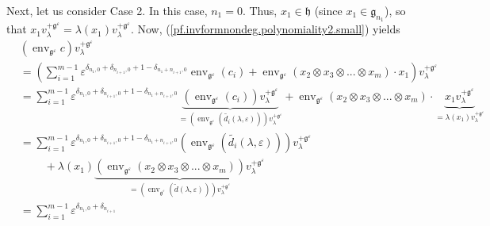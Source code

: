\documentclass[etingof-lie.tex]{subfiles}
\begin{document}
Next, let us consider Case 2. In this case, $n_{1}=0$. Thus, $x_{1}%
\in\mathfrak{h}$ (since $x_{1}\in\mathfrak{g}_{n_{1}}$), so that
$x_{1}v_{\lambda}^{+\mathfrak{g}^{\varepsilon}}=\lambda\left(  x_{1}\right)
v_{\lambda}^{+\mathfrak{g}^{\varepsilon}}$. Now,
(\ref{pf.invformnondeg.polynomiality2.small}) yields%
\begin{align}
&  \left(  \operatorname*{env}\nolimits_{\mathfrak{g}^{\varepsilon}}c\right)
v_{\lambda}^{+\mathfrak{g}^{\varepsilon}}\nonumber\\
&  =\left(  \sum\limits_{i=1}^{m-1}\varepsilon^{\delta_{n_{1},0}%
+\delta_{n_{i+1},0}+1-\delta_{n_{1}+n_{i+1},0}}\operatorname*{env}%
\nolimits_{\mathfrak{g}^{\varepsilon}}\left(  c_{i}\right)
+\operatorname*{env}\nolimits_{\mathfrak{g}^{\varepsilon}}\left(  x_{2}\otimes
x_{3}\otimes...\otimes x_{m}\right)  \cdot x_{1}\right)  v_{\lambda
}^{+\mathfrak{g}^{\varepsilon}}\nonumber\\
&  =\sum\limits_{i=1}^{m-1}\varepsilon^{\delta_{n_{1},0}+\delta_{n_{i+1}%
,0}+1-\delta_{n_{1}+n_{i+1},0}}\underbrace{\left(  \operatorname*{env}%
\nolimits_{\mathfrak{g}^{\varepsilon}}\left(  c_{i}\right)  \right)
v_{\lambda}^{+\mathfrak{g}^{\varepsilon}}}_{=\left(  \operatorname*{env}%
\nolimits_{\mathfrak{g}^{\varepsilon}}\left(  \widetilde{d_{i}}\left(
\lambda,\varepsilon\right)  \right)  \right)  v_{\lambda}^{+\mathfrak{g}%
^{\varepsilon}}}+\operatorname*{env}\nolimits_{\mathfrak{g}^{\varepsilon}%
}\left(  x_{2}\otimes x_{3}\otimes...\otimes x_{m}\right)  \cdot
\underbrace{x_{1}v_{\lambda}^{+\mathfrak{g}^{\varepsilon}}}_{=\lambda\left(
x_{1}\right)  v_{\lambda}^{+\mathfrak{g}^{\varepsilon}}}\nonumber\\
&  =\sum\limits_{i=1}^{m-1}\varepsilon^{\delta_{n_{1},0}+\delta_{n_{i+1}%
,0}+1-\delta_{n_{1}+n_{i+1},0}}\left(  \operatorname*{env}%
\nolimits_{\mathfrak{g}^{\varepsilon}}\left(  \widetilde{d_{i}}\left(
\lambda,\varepsilon\right)  \right)  \right)  v_{\lambda}^{+\mathfrak{g}%
^{\varepsilon}}\nonumber\\
&  \ \ \ \ \ \ \ \ \ \ +\lambda\left(  x_{1}\right)  \underbrace{\left(
\operatorname*{env}\nolimits_{\mathfrak{g}^{\varepsilon}}\left(  x_{2}\otimes
x_{3}\otimes...\otimes x_{m}\right)  \right)  v_{\lambda}^{+\mathfrak{g}%
^{\varepsilon}}}_{=\left(  \operatorname*{env}\nolimits_{\mathfrak{g}%
^{\varepsilon}}\left(  \widetilde{d}\left(  \lambda,\varepsilon\right)
\right)  \right)  v_{\lambda}^{+\mathfrak{g}^{\varepsilon}}}\nonumber\\
&  =\sum\limits_{i=1}^{m-1}\varepsilon^{\delta_{n_{1},0}+\delta_{n_{i+1}%
}}
\end{align}
\end{document}
